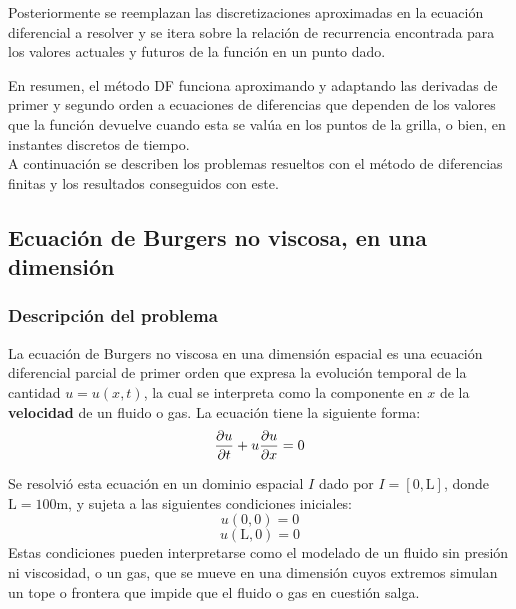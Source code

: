 \documentclass[12pt]{article}
\newcommand{\m}{\text{m}}
\begin{document}
	Posteriormente se reemplazan las discretizaciones aproximadas en la ecuación diferencial a resolver y se itera sobre la relación de recurrencia encontrada para los valores actuales y futuros de la función en un punto dado. 
	
	En resumen, el método DF funciona aproximando y adaptando las derivadas de primer y segundo orden a ecuaciones de diferencias que dependen de los valores que la función devuelve cuando esta se valúa en los puntos de la grilla, o bien, en instantes discretos de tiempo.\\
	
	A continuación se describen los problemas resueltos con el método de diferencias finitas y los resultados conseguidos con este.

	
	\subsection{Ecuación de Burgers no viscosa, en una dimensión}
	\label{sec:burgers1ddf}
	\subsubsection{Descripción del problema}
	La ecuación de Burgers no viscosa en una dimensión espacial es una ecuación diferencial parcial de primer orden que expresa la evolución temporal de la cantidad $u = u(x,t)$, la cual se interpreta como la componente en $x$ de la \textbf{velocidad} de un fluido o gas. La ecuación tiene la siguiente forma:
	\begin{equation}
		\pdv{u}{t}+u\pdv{u}{x}=0
		\label{eq:burgers1d}
	\end{equation}
	
	Se resolvió esta ecuación en un dominio espacial $I$ dado por $I = [0,\text{L}]$, donde $\text{L} = 100 \unit{\meter}$, y sujeta a las siguientes condiciones iniciales:\\
	\begin{equation}
		u(0,0)=0
	\end{equation}
	\begin{equation}
		u(\text{L},0)= 0
	\end{equation}
	Estas condiciones pueden interpretarse como el modelado de un fluido sin presión ni viscosidad, o un gas, que se mueve en una dimensión cuyos extremos simulan un tope o frontera que impide que el fluido o gas en cuestión salga. %
	
\end{document}
